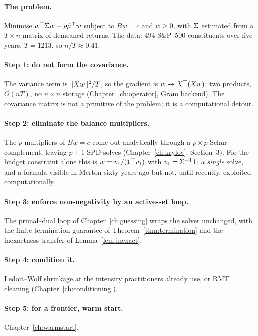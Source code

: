 \paragraph{The problem.} Minimise $w^{\top}\hat{\Sigma} w - \rho\hat\mu^{\top} w$ subject to
$Bw = c$ and $w \ge 0$, with $\hat{\Sigma}$ estimated from a $T \times n$ matrix of
demeaned returns. The data: $494$ S\&P~500 constituents over five years, $T = 1213$,
so $n/T \approx 0.41$.

\paragraph{Step 1: do not form the covariance.} The variance term is
$\lVert Xw \rVert^2/T$, so the gradient is $w \mapsto X^{\top}(Xw)$: two products, $O(nT)$, no
$n \times n$ storage (Chapter~\ref{ch:operator}, Gram backend). The covariance matrix is
not a primitive of the problem; it is a computational detour.

\paragraph{Step 2: eliminate the balance multipliers.} The $p$ multipliers of $Bw = c$
come out analytically through a $p\times p$ Schur complement, leaving $p+1$ SPD solves
(Chapter~\ref{ch:krylov}, Section~3). For the budget constraint alone this is
$w = v_1/(\mathbf{1}^{\top} v_1)$ with $v_1 = \hat{\Sigma}^{-1}\mathbf{1}$: a \emph{single} solve, and a
formula visible in Merton \cite{merton1972} sixty years ago but not, until recently,
exploited computationally.

\paragraph{Step 3: enforce non-negativity by an active-set loop.} The primal--dual loop
of Chapter~\ref{ch:guessing} wraps the solver unchanged, with the finite-termination
guarantee of Theorem~\ref{thm:termination} and the inexactness transfer of
Lemma~\ref{lem:inexact}.

\paragraph{Step 4: condition it.} Ledoit--Wolf shrinkage at the intensity practitioners
already use, or RMT cleaning (Chapter~\ref{ch:conditioning}).

\paragraph{Step 5: for a frontier, warm start.} Chapter~\ref{ch:warmstart}.

